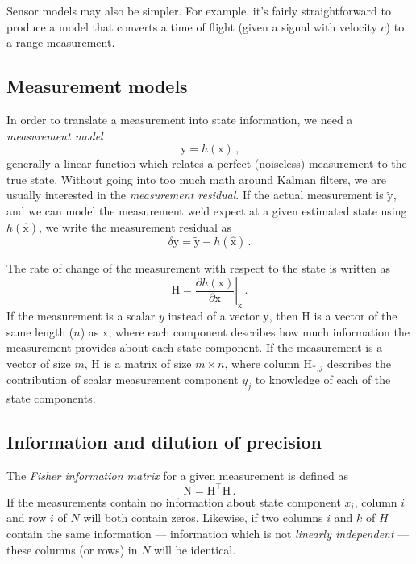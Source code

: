 \documentclass[12pt]{article}
\newcommand*\vect[1]{\mathrm{#1}}
\begin{document}
Sensor models may also be simpler. For example, it's fairly straightforward to produce a model that converts a time of flight (given a signal with velocity $c$) to a range measurement.

\subsection{Measurement models}
In order to translate a measurement into state information, we need a \textit{measurement model}
\begin{equation}
\vect{y} = h(\vect{x})\,\text{,}
\end{equation}
generally a linear function which relates a perfect (noiseless) measurement to the true state. Without going into too much math around Kalman filters, we are usually interested in the \textit{measurement residual}. If the actual measurement is $\tilde{\vect{y}}$, and we can model the measurement we'd expect at a given estimated state using $h(\hat{\vect{x}})$, we write the measurement residual as
\begin{equation}
\delta\vect{y} = \tilde{\vect{y}} - h(\hat{\vect{x}})\,\text{.}
\end{equation}

The rate of change of the measurement with respect to the state is written as
\begin{equation}
\vect{H} = \left.\frac{\partial h(\vect{x})}{\partial \vect{x}}\right|_{\hat{\vect{x}}}\,\text{.}
\end{equation}
If the measurement is a scalar $y$ instead of a vector $\vect{y}$, then $\vect{H}$ is a vector of the same length ($n$) as $\vect{x}$, where each component describes how much information the measurement provides about each state component. If the measurement is a vector of size $m$, $\vect{H}$ is a matrix of size $m\times n$, where column $\vect{H}_{*,j}$ describes the contribution of scalar measurement component $y_j$ to knowledge of each of the state components.

\subsection{Information and dilution of precision}
The \textit{Fisher information matrix} for a given measurement is defined as
\begin{equation}
\vect{N} = \vect{H}^\top \vect{H}\,\text{.}
\end{equation}
If the measurements contain no information about state component $x_i$, column $i$ and row $i$ of $N$ will both contain zeros. Likewise, if two columns $i$ and $k$ of $H$ contain the same information --- information which is not \textit{linearly independent} --- these columns (or rows) in $N$ will be identical.
\end{document}
